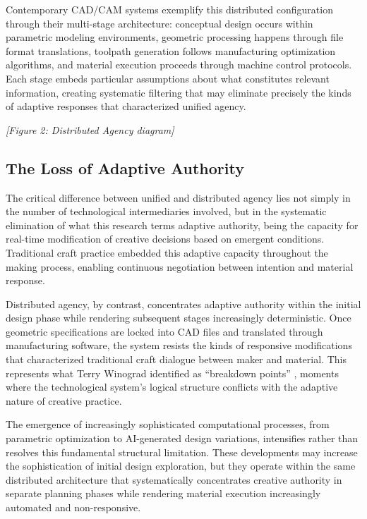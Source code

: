 \vspace{0.5cm}

Contemporary CAD/CAM systems exemplify this distributed configuration through their multi-stage architecture: conceptual design occurs within parametric modeling environments, geometric processing happens through file format translations, toolpath generation follows manufacturing optimization algorithms, and material execution proceeds through machine control protocols. Each stage embeds particular assumptions about what constitutes relevant information, creating systematic filtering that may eliminate precisely the kinds of adaptive responses that characterized unified agency.

\vspace{0.5cm}

\textit{[Figure 2: Distributed Agency diagram]}

\subsection{The Loss of Adaptive Authority}

The critical difference between unified and distributed agency lies not simply in the number of technological intermediaries involved, but in the systematic elimination of what this research terms adaptive authority, being the capacity for real-time modification of creative decisions based on emergent conditions. Traditional craft practice embedded this adaptive capacity throughout the making process, enabling continuous negotiation between intention and material response.

\vspace{0.5cm}

Distributed agency, by contrast, concentrates adaptive authority within the initial design phase while rendering subsequent stages increasingly deterministic. Once geometric specifications are locked into CAD files and translated through manufacturing software, the system resists the kinds of responsive modifications that characterized traditional craft dialogue between maker and material. This represents what Terry Winograd identified as ``breakdown points'' \citep{winograd1986}, moments where the technological system's logical structure conflicts with the adaptive nature of creative practice.

\vspace{0.5cm}

The emergence of increasingly sophisticated computational processes, from parametric optimization to AI-generated design variations, intensifies rather than resolves this fundamental structural limitation. These developments may increase the sophistication of initial design exploration, but they operate within the same distributed architecture that systematically concentrates creative authority in separate planning phases while rendering material execution increasingly automated and non-responsive.

